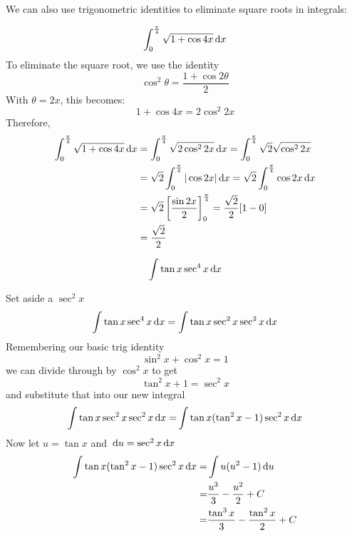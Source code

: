 We can also use trigonometric identities to eliminate square roots in integrals:
\begin{ex}
  \[ \int^{\frac{\pi}{4}}_{0} \sqrt{1+\cos{4x}}\,\mathrm{d} x \]
  To eliminate the square root, we use the identity
  \[ \cos^2 \theta = \frac{1+\cos{2 \theta}}{2} \]
  With $\theta=2x$, this becomes:
  \[ 1+\cos{4x}=2\cos^2{2x} \]
  Therefore,
  \begin{align*}
    \int^{\frac{\pi}{4}}_{0} \sqrt{1+\cos{4x}}\,\mathrm{d} x&= \int^{\frac{\pi}{4}}_{0} \sqrt{2 \cos^2{2x}} \,\mathrm{d} x = \int^{\frac{\pi}{4}}_{0} \sqrt2 \sqrt{\cos^2{2x}} \\
    &= \sqrt2 \int^{\frac{\pi}{4}}_{0} |\cos{2x}|\,\mathrm{d} x = \sqrt2 \int^{\frac{\pi}{4}}_{0} \cos{2x}\,\mathrm{d} x \\
    &= \sqrt2 \left[\frac{\sin{2x}}{2}\right]^{\frac{\pi}{4}}_{0} = \frac{\sqrt2}{2}[1-0] \\
    &= \frac{\sqrt2}{2}
  \end{align*}
\end{ex}

\begin{ex}
  \[ \int \tan x \sec^4x \,\mathrm{d} x \]
  \begin{sol}
    Set aside a $\sec^2x$
    \begin{align*}
      \int \tan x\sec^4x \,\mathrm{d} x
      = \int \tan x \sec^2 x \sec^2 x \,\mathrm{d} x
    \end{align*}
    Remembering our basic trig identity
    \[ \sin^2x + \cos^2x = 1\]
    we can divide through by $\cos^2x$ to get
    \[ \tan^2x+1=\sec^2x \]
    and substitute that into our new integral
    \begin{align*}
      \int \tan x \sec^2 x \sec^2 x \,\mathrm{d} x
      =& \int \tan x (\tan^2x-1) \sec^2x \,\mathrm{d} x \\
    \end{align*}
    Now let $u=\tan x$ and $\,\mathrm{d} u = \sec^2x \,\mathrm{d} x$
    \begin{align*}
      \int \tan x (\tan^2x-1) \sec^2x \,\mathrm{d} x
      =& \int u (u^2-1) \,\mathrm{d} u \\
      =& \frac{u^3}{3}-\frac{u^2}{2}+C \\
      =& \frac{\tan^3x}{3}-\frac{\tan^2x}{2} +C
    \end{align*}
  \end{sol}
\end{ex}
